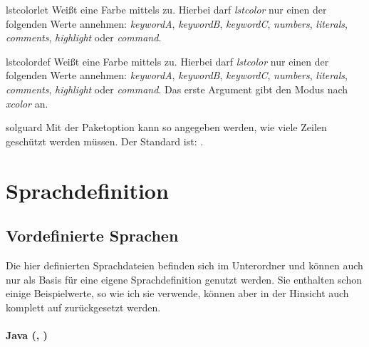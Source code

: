 \documentclass{sopra-base}
\begin{document}
\begin{command}{lstcolorlet}{}
    Weißt eine Farbe mittels  zu. Hierbei darf \emph{lstcolor} nur einen der folgenden Werte annehmen: \emph{keywordA}, \emph{keywordB}, \emph{keywordC}, \emph{numbers}, \emph{literals}, \emph{comments}, \emph{highlight} oder \emph{command}. 
\end{command}

\begin{command}{lstcolordef}{}
    Weißt eine Farbe mittels  zu. Hierbei darf \emph{lstcolor} nur einen der folgenden Werte annehmen: \emph{keywordA}, \emph{keywordB}, \emph{keywordC}, \emph{numbers}, \emph{literals}, \emph{comments}, \emph{highlight} oder \emph{command}. Das erste Argument gibt den Modus nach \emph{xcolor} an.
\end{command}

\begin{command}{solguard}{}
    Mit der Paketoption  kann so angegeben werden, wie viele Zeilen geschützt werden müssen.
    Der Standard ist: \glqq{}{\makeatletter\@sol@guard@default}\grqq.
\end{command}

\clearpage
\appendix
\section{Sprachdefinition}

\subsection{Vordefinierte Sprachen}
\label{sec:vordefinierteSprachen}

Die hier definierten Sprachdateien befinden sich im Unterordner  und können auch nur als Basis für eine eigene Sprachdefinition genutzt werden. Sie enthalten schon einige Beispielwerte, so wie ich sie verwende, können aber in der Hinsicht auch komplett
auf  zurückgesetzt werden. 

\paragraph{Java (, )}
\end{document}

